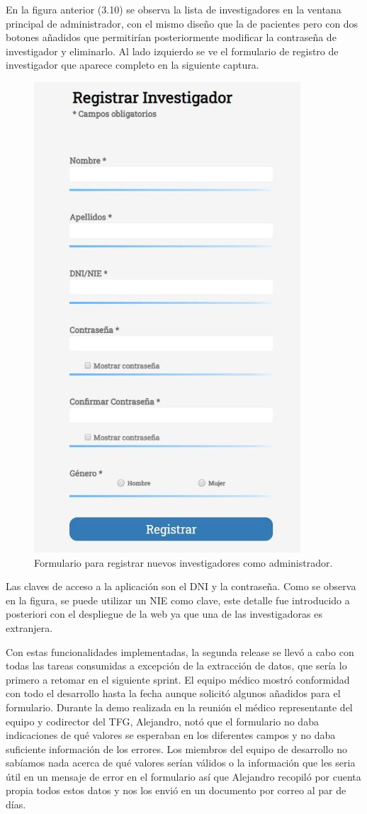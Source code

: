 En la figura anterior (3.10) se observa la lista de investigadores en la ventana principal de administrador, con el mismo diseño que la de pacientes pero con dos botones añadidos que permitirían posteriormente modificar la contraseña de investigador y eliminarlo. Al lado izquierdo se ve el formulario de registro de investigador que aparece completo en la siguiente captura.

\begin{figure}[h]
    \centering
     \includegraphics[width=6.cm,height=10.cm]{images/registrarInvestigadores.jpg}
    \caption{Formulario para registrar nuevos investigadores como administrador.}
\end{figure}
\newpage

Las claves de acceso a la aplicación son el DNI y la contraseña. Como se observa en la figura, se puede utilizar un NIE como clave, este detalle fue introducido a posteriori con el despliegue de la web ya que una de las investigadoras es extranjera.
\newline

Con estas funcionalidades implementadas, la segunda release se llevó a cabo con todas las tareas consumidas a excepción de la extracción de datos, que sería lo primero a retomar en el siguiente sprint. El equipo médico mostró conformidad con todo el desarrollo hasta la fecha aunque solicitó algunos añadidos para el formulario. Durante la demo realizada en la reunión el médico representante del equipo y codirector del TFG, Alejandro, notó que el formulario no daba indicaciones de qué valores se esperaban en los diferentes campos y no daba suficiente información de los errores. Los miembros del equipo de desarrollo no sabíamos nada acerca de qué valores serían válidos o la información que les seria útil en un mensaje de error en el formulario así que Alejandro recopiló por cuenta propia todos estos datos y nos los envió en un documento por correo al par de días.

